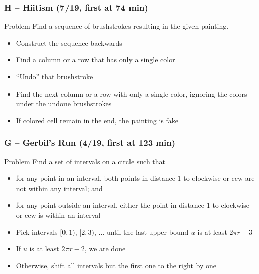 \documentclass{beamer}
\begin{document}
\begin{frame}
\frametitle{H -- Hiitism (7/19, first at 74 min)}
    \begin{block}{Problem}
        Find a sequence of brushstrokes resulting in the given painting.
    \end{block}
    \begin{itemize}
        \item Construct the sequence backwards
        \item Find a column or a row that has only a single color
        \item ``Undo'' that brushstroke
        \item Find the next column or a row with only a single color, ignoring the colors under the undone brushstrokes
        \item If colored cell remain in the end, the painting is fake
    \end{itemize}
\end{frame}


\begin{frame}
\frametitle{G -- Gerbil's Run (4/19, first at 123 min)}
    \begin{block}{Problem}
        Find a set of intervals on a circle such that
        \begin{itemize}
            \item for any point in an interval, both points in distance $1$ to clockwise or ccw are not within any interval; and
            \item for any point outside an interval, either the point in distance $1$ to clockwise or ccw is within an interval
        \end{itemize}
    \end{block}
    \begin{itemize}
        \item Pick intervals $[0, 1)$, $[2, 3)$, $\dots$ until the last upper bound $u$ is at least $2\pi r - 3$
        \item If $u$ is at least $2\pi r - 2$, we are done
        \item Otherwise, shift all intervals but the first one to the right by one
    \end{itemize}
\end{frame}
\end{document}
